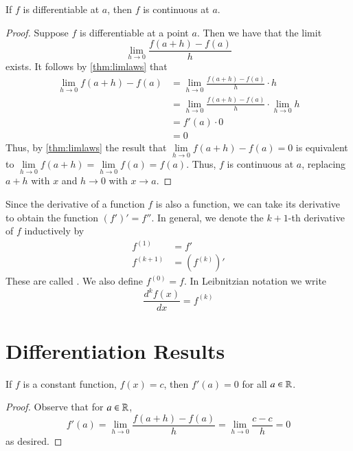 \documentclass[12pt, a4paper, oneside, openright, titlepage]{book}
\begin{document}
\begin{thm}
    If $f$ is differentiable at $a$, then $f$ is continuous at $a$.
\end{thm}
\begin{proof}
    Suppose $f$ is differentiable at a point $a$. Then we have that the limit $$\lim\limits_{h\rightarrow 0}\frac{f(a+h) - f(a)}{h}$$ exists. It follows by \ref{thm:limlaws} that \begin{align*}
        \lim\limits_{h\rightarrow 0}f(a+h) - f(a) &= \lim\limits_{h\rightarrow 0}\frac{f(a+h)-f(a)}{h}\cdot h \\
        &= \lim\limits_{h\rightarrow 0}\frac{f(a+h) - f(a)}{h}\cdot \lim\limits_{h\rightarrow 0} h\\
        &= f'(a)\cdot 0\\
        &= 0
    \end{align*}
    Thus, by \ref{thm:limlaws} the result that $\lim\limits_{h\rightarrow 0}f(a+h) - f(a) = 0$ is equivalent to $\lim\limits_{h\rightarrow 0}f(a+h) = \lim\limits_{h\rightarrow 0} f(a) = f(a)$. Thus, $f$ is continuous at $a$, replacing $a+h$ with $x$ and $h\rightarrow 0$ with $x \rightarrow a$.
\end{proof}


\begin{defn}
    Since the derivative of a function $f$ is also a function, we can take its derivative to obtain the function $(f')' = f''$. In general, we denote the $k+1$-th derivative of $f$ inductively by \begin{align*}
        f^{(1)} &= f' \\
        f^{(k+1)} &= (f^{(k)})'
    \end{align*}
    These are called . We also define $f^{(0)} = f$. In Leibnitzian notation we write \begin{equation}
        \frac{d^kf(x)}{dx} = f^{(k)}
    \end{equation}
\end{defn}

\section{Differentiation Results}

\begin{thm}
    If $f$ is a constant function, $f(x) = c$, then $f'(a) = 0$ for all $a \in \mathbb R$.
\end{thm}
\begin{proof}
    Observe that for $a \in \mathbb R$, $$f'(a) = \lim\limits_{h\rightarrow 0}\frac{f(a+h)-f(a)}{h} = \lim\limits_{h\rightarrow 0}\frac{c-c}{h} = 0$$
    as desired.
\end{proof}
\end{document}
